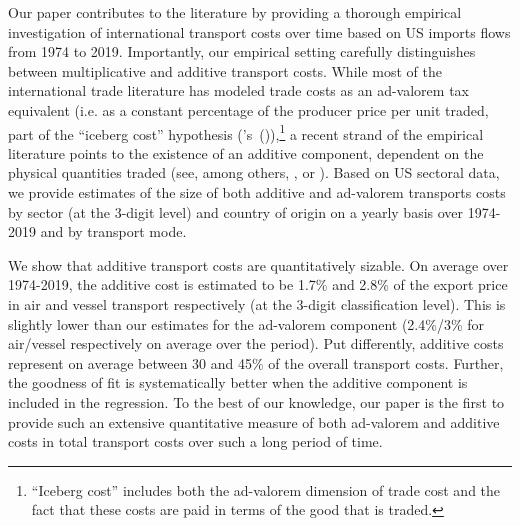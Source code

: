 \documentclass[a4paper,11pt]{article}
\newcommand\cites[1]{\citeauthor{#1}'s\ (\citeyear{#1})}
\begin{document}
Our paper contributes to the literature by providing a thorough empirical investigation of international transport costs over time based on US imports flows from 1974 to 2019. Importantly, our empirical setting carefully distinguishes between multiplicative and additive transport costs. While most of the international trade literature has modeled trade costs as an ad-valorem tax equivalent (i.e. as a constant percentage of the producer price per unit traded, part of the ``iceberg cost'' hypothesis (\cites{samuelson1954}),\footnote{``Iceberg cost'' includes both the ad-valorem dimension of trade cost and the fact that these costs are paid in terms of the good that is traded.} a recent strand of the empirical literature points to the existence of an additive component, dependent on the physical quantities traded (see, among others, \cite{Irrazabal_2015}, or \cite{martin2012}). Based on US sectoral data, we provide estimates of the size of both additive and ad-valorem transports costs by sector (at the 3-digit level) and country of origin on a yearly basis over 1974-2019 and by transport mode.\smallskip


We show that additive transport costs are quantitatively sizable. On average over 1974-2019, the additive cost is estimated to be 1.7\% and 2.8\% of the export price in air and vessel transport respectively (at the 3-digit classification level). This is slightly lower than our estimates for the ad-valorem component (2.4\%/3\% for air/vessel respectively on average over the period).
Put differently, additive costs represent on average between 30 and 45\% of the overall transport costs. Further, the goodness of fit is systematically better when the additive component is included in the regression. To the best of our knowledge, our paper is the first to provide such an extensive quantitative measure of both ad-valorem and additive costs in total transport costs over such a long period of time. \smallskip
\end{document}
